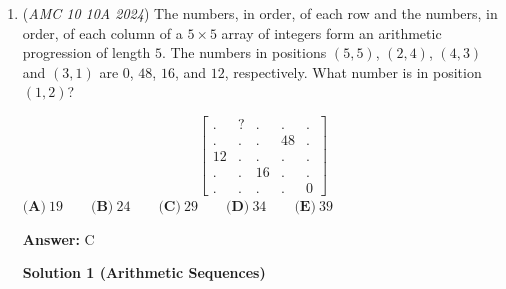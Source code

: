 \begin{enumerate}
 



\textbf{Solution 3}

We find the following pairs of numbers work: 

 
 \[(1,4), (4,8), (8,11), (11,14), (14, 18), (18, 21), (21, 24) \dots\]

 
Call a number an OE (odd-even) pair if the first number in the pair is odd and the second is even. Do the same for EE (even-even) and EO (even-odd) pairs. Notice that we're adding 10 to the pairs in each set, so there are 404 numbers in each set of pairs \textbf{excluding 1 and 2024:}

 
\textbf{OE pairs:} 
 \[(1,4), (11,14), ... , (2021,2024) \implies (202 + 1) \cdot 2 - 2 = 404\] 

 
\textbf{EE pairs:} 
 \[(4,8), (14,18), ..., (2014,2018)  \implies (201 + 1) \cdot 2 = 404\] 

 
\textbf{EO pairs:} 
 \[(8,11), (18,21), ..., (2018, 2021) \implies (201 + 1) \cdot 2 = 404\] 

 
Every number besides $1$ and $2024$ is being overcounted twice (for example, $4$ is counted twice in the EE and OE pairs), so we have $404 \cdot \frac{3}{2} = 606.$ Finally, we add $2$ (adding back $1$ and $2024$) to get $\boxed{\textbf{(C) }608}$.

 


	\item (\textit{AMC 10 10A 2024}) The numbers, in order, of each row and the numbers, in order, of each column of a $5 \times 5$ array of integers form an arithmetic progression of length $5$. The numbers in positions $(5, 5)$, $(2, 4)$, $(4, 3)$ and $(3, 1)$ are $0$, $48$, $16$, and $12$, respectively. What number is in position $(1, 2)$?

 \[\begin{bmatrix} . & ? &.&.&. \\ .&.&.&48&.\\ 12&.&.&.&.\\ .&.&16&.&.\\ .&.&.&.&0\end{bmatrix}\]
$\textbf{(A)}~19\qquad\textbf{(B)}~24\qquad\textbf{(C)}~29\qquad\textbf{(D)}~34\qquad\textbf{(E)}~39$

 \textbf{Answer: }C



\textbf{Solution 1 (Arithmetic Sequences)}


\end{enumerate}
